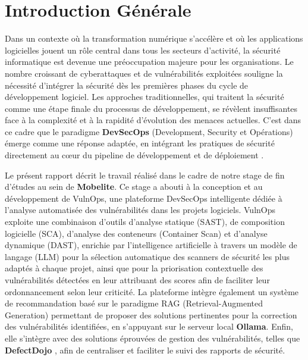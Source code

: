 \documentclass[12pt, a4paper, oneside]{report}
\begin{document}
\chapter*{Introduction Générale}

Dans un contexte où la transformation numérique s'accélère et où les applications
logicielles jouent un rôle central dans tous les secteurs d'activité, la sécurité
informatique est devenue une préoccupation majeure pour les organisations. Le nombre
croissant de cyberattaques et de vulnérabilités exploitées souligne la nécessité
d'intégrer la sécurité dès les premières phases du cycle de développement logiciel.
Les approches traditionnelles, qui traitent la sécurité comme une étape finale du
processus de développement, se révèlent insuffisantes face à la complexité et à la
rapidité d'évolution des menaces actuelles. C'est dans ce cadre que le paradigme
\textbf{DevSecOps} (Development, Security et Opérations) émerge comme une réponse
adaptée, en intégrant les pratiques de sécurité directement au cœur du pipeline
de développement et de déploiement \cite{devsecopsgartner}.

Le présent rapport décrit le travail réalisé dans le cadre de notre stage de fin d’études au sein de \textbf{Mobelite}. Ce stage a abouti à la conception et au développement de VulnOps, une plateforme DevSecOps intelligente dédiée à l’analyse automatisée des vulnérabilités dans les projets logiciels. VulnOps exploite une combinaison d’outils d’analyse statique (SAST), de composition logicielle (SCA), d’analyse des conteneurs (Container Scan) et d’analyse dynamique (DAST), enrichie par l’intelligence artificielle à travers un modèle de langage (LLM) pour la sélection automatique des scanners de sécurité les plus adaptés à chaque projet, ainsi que pour la priorisation contextuelle des vulnérabilités détectées en leur attribuant des scores afin de faciliter leur ordonnancement selon leur criticité. La plateforme intègre également un système de recommandation basé sur le paradigme RAG (Retrieval-Augmented Generation) permettant de proposer des solutions pertinentes pour la correction des vulnérabilités identifiées, en s'appuyant sur le serveur local \textbf{Ollama}. Enfin, elle s’intègre avec des solutions éprouvées de gestion des vulnérabilités, telles que \textbf{DefectDojo} \cite{defectdojo}, afin de centraliser et faciliter le suivi des rapports de sécurité.
\end{document}
